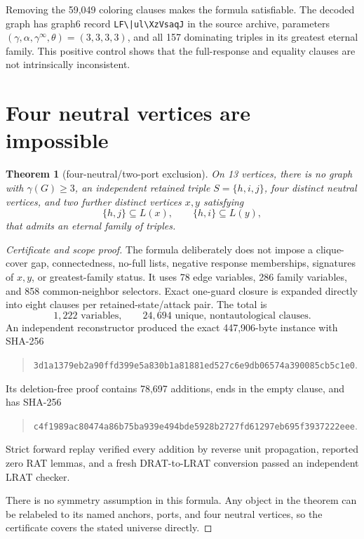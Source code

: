 \documentclass[11pt]{article}
\newtheorem{theorem}{Theorem}[section]
\theoremstyle{definition}
\theoremstyle{remark}
\newcommand{\gaminf}{\gamma^{\infty}}
\newcommand{\filehash}[1]{\nolinkurl{#1}}
\begin{document}
Removing the 59,049 coloring clauses makes the formula satisfiable.  The
decoded graph has graph6 record
\verb!LF\|ul\XzVsaqJ! in the source
archive, parameters
\((\gamma,\alpha,\gaminf,\theta)=(3,3,3,3)\), and all 157 dominating
triples in its greatest eternal family.  This positive control shows that
the full-response and equality clauses are not intrinsically inconsistent.

\section{Four neutral vertices are impossible}\label{sec:neutral}

\begin{theorem}[four-neutral/two-port exclusion]\label{thm:four-neutral}
On 13 vertices, there is no graph with \(\gamma(G)\geq3\), an independent
retained triple \(S=\{h,i,j\}\), four distinct neutral vertices, and two
further distinct vertices \(x,y\) satisfying
\[
  \{h,j\}\subseteq L(x),\qquad
  \{h,i\}\subseteq L(y),
\tag{5.1}
\]
that admits an eternal family of triples.
\end{theorem}

\begin{proof}[Certificate and scope proof]
The formula deliberately does not impose a clique-cover gap,
connectedness, no-full lists, negative response memberships, signatures of
\(x,y\), or greatest-family status.  It uses 78 edge variables, 286 family
variables, and 858 common-neighbor selectors.  Exact one-guard closure is
expanded directly into eight clauses per retained-state/attack pair.  The
total is
\[
  1,222\text{ variables},\qquad
  24,694\text{ unique, nontautological clauses}.
\tag{5.2}
\]
An independent reconstructor produced the exact 447,906-byte instance with
SHA-256
\begin{quote}\small
\filehash{3d1a1379eb2a90ffd399e5a830b1a81881ed527c6e9db06574a390085cb5c1e0}.
\end{quote}
Its deletion-free proof contains 78,697 additions, ends in the empty
clause, and has SHA-256
\begin{quote}\small
\filehash{c4f1989ac80474a86b75ba939e494bde5928b2727fd61297eb695f3937222eee}.
\end{quote}
Strict forward replay verified every addition by reverse unit propagation,
reported zero RAT lemmas, and a fresh DRAT-to-LRAT conversion passed an
independent LRAT checker.

There is no symmetry assumption in this formula.  Any object in the
theorem can be relabeled to its named anchors, ports, and four neutral
vertices, so the certificate covers the stated universe directly.
\end{proof}
\end{document}
